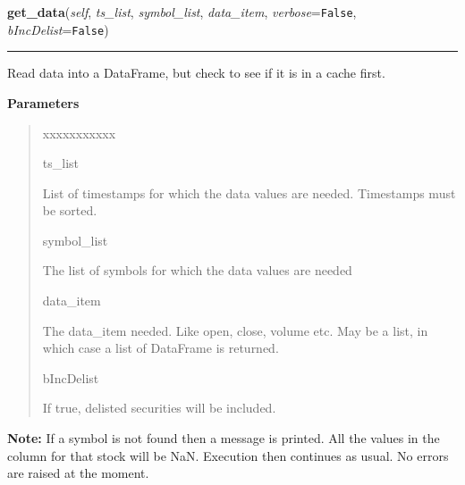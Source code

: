     \vspace{0.5ex}

\hspace{.8\funcindent}\begin{boxedminipage}{\funcwidth}

    \raggedright \textbf{get\_data}(\textit{self}, \textit{ts\_list}, \textit{symbol\_list}, \textit{data\_item}, \textit{verbose}={\tt False}, \textit{bIncDelist}={\tt False})

    \vspace{-1.5ex}

    \rule{\textwidth}{0.5\fboxrule}
\setlength{\parskip}{2ex}
    Read data into a DataFrame, but check to see if it is in a cache first.

\setlength{\parskip}{1ex}
      \textbf{Parameters}
      \vspace{-1ex}

      \begin{quote}
        \begin{Ventry}{xxxxxxxxxxx}

          \item[ts\_list]

          List of timestamps for which the data values are needed. 
          Timestamps must be sorted.

          \item[symbol\_list]

          The list of symbols for which the data values are needed

          \item[data\_item]

          The data\_item needed. Like open, close, volume etc.  May be a 
          list, in which case a list of DataFrame is returned.

          \item[bIncDelist]

          If true, delisted securities will be included.

        \end{Ventry}

      \end{quote}

\textbf{Note:} If a symbol is not found then a message is printed. All the values in the 
column for that stock will be NaN. Execution then continues as usual. No 
errors are raised at the moment.



    \end{boxedminipage}

